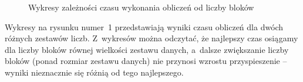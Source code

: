 \documentclass[a4paper,12pt]{article}
\begin{document}
\begin{figure}[!hbp]
\begin{center}
  \caption{Wykresy zależności czasu wykonania obliczeń od liczby bloków}
\end{center}
\end{figure}
Wykresy na rysunku numer~1 przedstawiają wyniki czasu obliczeń dla dwóch różnych zestawów liczb. Z~wykresów można odczytać, że najlepszy czas osiągamy dla liczby bloków równej wielkości zestawu danych, a~dalsze zwiększanie liczby bloków (ponad rozmiar zestawu danych) nie przynosi wzrostu przyspieszenie -- wyniki nieznacznie się różnią od tego najlepszego.
\end{document}
